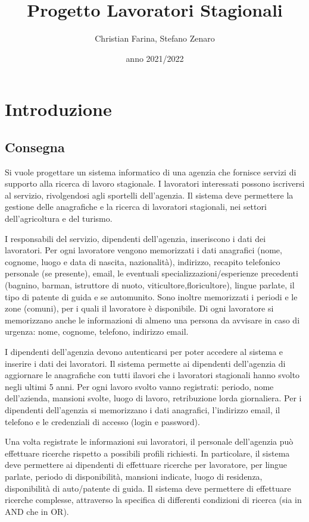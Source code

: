 \documentclass[ 4paper,11pt,openany]{book}
\title{Progetto Lavoratori Stagionali}
\author{Christian Farina,  Stefano Zenaro}
\date{anno 2021/2022}
\begin{document}
\frontmatter
\maketitle
\tableofcontents 

\mainmatter
\chapter{Introduzione}
\section{Consegna}
Si vuole progettare un sistema informatico di una agenzia che fornisce servizi di supporto alla ricerca di lavoro stagionale. I lavoratori interessati possono iscriversi al servizio, rivolgendosi agli sportelli dell’agenzia. Il sistema deve permettere la gestione delle anagrafiche e la ricerca di lavoratori
stagionali, nei settori dell’agricoltura e del turismo. 

I responsabili del servizio, dipendenti dell’agenzia, inseriscono i dati dei lavoratori. 
Per ogni lavoratore vengono memorizzati i dati anagrafici (nome, cognome, luogo e data di nascita, nazionalità), indirizzo, recapito telefonico personale (se presente), email, le eventuali
specializzazioni/esperienze precedenti (bagnino, barman, istruttore di nuoto, viticultore,floricultore), lingue parlate, il tipo di patente di guida e se automunito. Sono inoltre memorizzati i periodi e le zone (comuni), per i quali il lavoratore è disponibile. Di ogni lavoratore si memorizzano anche le informazioni di almeno una persona da avvisare in caso di urgenza: nome, cognome, telefono, indirizzo email. 

I dipendenti dell’agenzia devono autenticarsi per poter accedere al sistema e inserire i dati dei lavoratori. Il sistema permette ai dipendenti dell’agenzia di aggiornare le anagrafiche con tutti ilavori che i lavoratori stagionali hanno svolto negli ultimi 5 anni. 
Per ogni lavoro svolto vanno registrati: periodo, nome dell’azienda, mansioni svolte, luogo di lavoro, retribuzione lorda giornaliera. Per i dipendenti dell’agenzia si memorizzano i dati anagrafici, l’indirizzo email, il telefono e le credenziali di accesso (login e password).

Una volta registrate le informazioni sui lavoratori, il personale dell’agenzia può effettuare ricerche rispetto a possibili profili richiesti.
In particolare, il sistema deve permettere ai dipendenti di effettuare ricerche per lavoratore, per lingue parlate, periodo di disponibilità, mansioni indicate, luogo di residenza, disponibilità di auto/patente di guida. Il sistema deve permettere di effettuare ricerche complesse, attraverso la specifica di differenti condizioni di ricerca (sia in AND che in OR).
\end{document}
